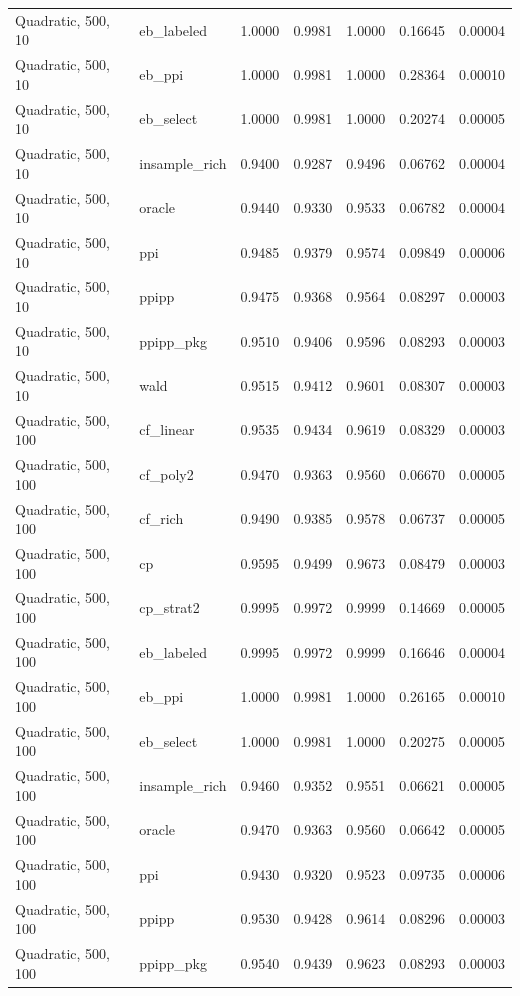 \begin{longtable}{llrrrrr}
Quadratic, 500, 10 & eb\_labeled & 1.0000 & 0.9981 & 1.0000 & 0.16645 & 0.00004 \\
Quadratic, 500, 10 & eb\_ppi & 1.0000 & 0.9981 & 1.0000 & 0.28364 & 0.00010 \\
Quadratic, 500, 10 & eb\_select & 1.0000 & 0.9981 & 1.0000 & 0.20274 & 0.00005 \\
Quadratic, 500, 10 & insample\_rich & 0.9400 & 0.9287 & 0.9496 & 0.06762 & 0.00004 \\
Quadratic, 500, 10 & oracle & 0.9440 & 0.9330 & 0.9533 & 0.06782 & 0.00004 \\
Quadratic, 500, 10 & ppi & 0.9485 & 0.9379 & 0.9574 & 0.09849 & 0.00006 \\
Quadratic, 500, 10 & ppipp & 0.9475 & 0.9368 & 0.9564 & 0.08297 & 0.00003 \\
Quadratic, 500, 10 & ppipp\_pkg & 0.9510 & 0.9406 & 0.9596 & 0.08293 & 0.00003 \\
Quadratic, 500, 10 & wald & 0.9515 & 0.9412 & 0.9601 & 0.08307 & 0.00003 \\
Quadratic, 500, 100 & cf\_linear & 0.9535 & 0.9434 & 0.9619 & 0.08329 & 0.00003 \\
Quadratic, 500, 100 & cf\_poly2 & 0.9470 & 0.9363 & 0.9560 & 0.06670 & 0.00005 \\
Quadratic, 500, 100 & cf\_rich & 0.9490 & 0.9385 & 0.9578 & 0.06737 & 0.00005 \\
Quadratic, 500, 100 & cp & 0.9595 & 0.9499 & 0.9673 & 0.08479 & 0.00003 \\
Quadratic, 500, 100 & cp\_strat2 & 0.9995 & 0.9972 & 0.9999 & 0.14669 & 0.00005 \\
Quadratic, 500, 100 & eb\_labeled & 0.9995 & 0.9972 & 0.9999 & 0.16646 & 0.00004 \\
Quadratic, 500, 100 & eb\_ppi & 1.0000 & 0.9981 & 1.0000 & 0.26165 & 0.00010 \\
Quadratic, 500, 100 & eb\_select & 1.0000 & 0.9981 & 1.0000 & 0.20275 & 0.00005 \\
Quadratic, 500, 100 & insample\_rich & 0.9460 & 0.9352 & 0.9551 & 0.06621 & 0.00005 \\
Quadratic, 500, 100 & oracle & 0.9470 & 0.9363 & 0.9560 & 0.06642 & 0.00005 \\
Quadratic, 500, 100 & ppi & 0.9430 & 0.9320 & 0.9523 & 0.09735 & 0.00006 \\
Quadratic, 500, 100 & ppipp & 0.9530 & 0.9428 & 0.9614 & 0.08296 & 0.00003 \\
Quadratic, 500, 100 & ppipp\_pkg & 0.9540 & 0.9439 & 0.9623 & 0.08293 & 0.00003 \\

\end{longtable}
